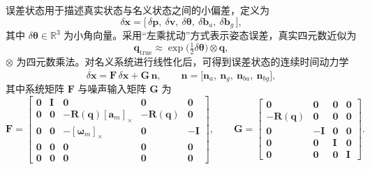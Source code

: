 误差状态用于描述真实状态与名义状态之间的小偏差，定义为
\begin{equation}
    \delta\mathbf{x}
    =
    \bigl[\,
        \delta\mathbf{p},\ 
        \delta\mathbf{v},\ 
        \delta\boldsymbol\theta,\ 
        \delta\mathbf{b}_a,\ 
        \delta\mathbf{b}_g
    \,\bigr],
    \label{eq:error_state}
\end{equation}
其中 $\delta\boldsymbol\theta \in \mathbb{R}^3$ 为小角向量。采用“左乘扰动”方式表示姿态误差，真实四元数近似为
\begin{equation}
    \mathbf{q}_{\mathrm{true}}
    \approx
    \exp\bigl(\tfrac{1}{2}\delta\boldsymbol\theta\bigr) \otimes \mathbf{q},
\end{equation}
$\otimes$ 为四元数乘法。对名义系统进行线性化后，可得到误差状态的连续时间动力学
\begin{equation}
    \dot{\delta\mathbf{x}}
    =
    \mathbf{F}\,\delta\mathbf{x} + \mathbf{G}\,\mathbf{n},
    \qquad
    \mathbf{n} = \bigl[\mathbf{n}_a,\ \mathbf{n}_g,\ \mathbf{n}_{ba},\ \mathbf{n}_{bg}\bigr],
    \label{eq:error_dyn}
\end{equation}
其中系统矩阵 $\mathbf{F}$ 与噪声输入矩阵 $\mathbf{G}$ 为
\begin{equation}
    \mathbf{F}
    =
    \begin{bmatrix}
        \mathbf{0} & \mathbf{I} & \mathbf{0} & \mathbf{0} & \mathbf{0} \\
        \mathbf{0} & \mathbf{0} & -\mathbf{R}(\mathbf{q})[\mathbf{a}_m]_\times & -\mathbf{R}(\mathbf{q}) & \mathbf{0} \\[2pt]
        \mathbf{0} & \mathbf{0} & -[\boldsymbol\omega_m]_\times & \mathbf{0} & -\mathbf{I} \\
        \mathbf{0} & \mathbf{0} & \mathbf{0} & \mathbf{0} & \mathbf{0} \\
        \mathbf{0} & \mathbf{0} & \mathbf{0} & \mathbf{0} & \mathbf{0}
    \end{bmatrix},
    \qquad
    \mathbf{G}
    =
    \begin{bmatrix}
        \mathbf{0} & \mathbf{0} & \mathbf{0} & \mathbf{0} \\
        -\mathbf{R}(\mathbf{q}) & \mathbf{0} & \mathbf{0} & \mathbf{0} \\
        \mathbf{0} & -\mathbf{I} & \mathbf{0} & \mathbf{0} \\
        \mathbf{0} & \mathbf{0} & \mathbf{I} & \mathbf{0} \\
        \mathbf{0} & \mathbf{0} & \mathbf{0} & \mathbf{I}
    \end{bmatrix}.
    \label{eq:F_G}
\end{equation}
